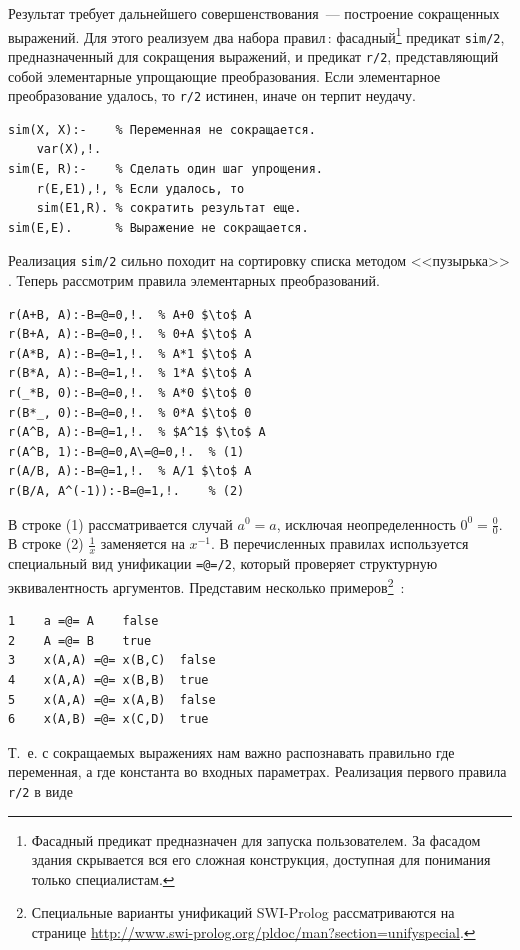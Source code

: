 \documentclass[a4paper,14pt, openany, twoside, draft]{extbook} %
\begin{document}
Результат требует дальнейшего совершенствования~--- построение сокращенных выражений.  Для этого реализуем два набора правил\,: фасадный\footnote{Фасадный предикат предназначен для запуска пользователем.  За фасадом здания скрывается вся его сложная конструкция, доступная для понимания только специалистам. } предикат \texttt{sim/2}, предназначенный для сокращения выражений, и предикат \texttt{r/2}, представляющий собой элементарные упрощающие преобразования.  Если элементарное преобразование удалось, то \texttt{r/2} истинен, иначе он терпит неудачу.

\begin{verbatim}
sim(X, X):-    % Переменная не сокращается.
    var(X),!.
sim(E, R):-    % Сделать один шаг упрощения.
    r(E,E1),!, % Если удалось, то
    sim(E1,R). % сократить результат еще.
sim(E,E).      % Выражение не сокращается.
\end{verbatim}

\noindent{}Реализация \texttt{sim/2} сильно походит на сортировку списка методом <<пузырька>> \cite{ais}.  Теперь рассмотрим правила элементарных преобразований.

\begin{verbatim}
r(A+B, A):-B=@=0,!.  % A+0 $\to$ A
r(B+A, A):-B=@=0,!.  % 0+A $\to$ A
r(A*B, A):-B=@=1,!.  % A*1 $\to$ A
r(B*A, A):-B=@=1,!.  % 1*A $\to$ A
r(_*B, 0):-B=@=0,!.  % A*0 $\to$ 0
r(B*_, 0):-B=@=0,!.  % 0*A $\to$ 0
r(A^B, A):-B=@=1,!.  % $A^1$ $\to$ A
r(A^B, 1):-B=@=0,A\=@=0,!.  % (1)
r(A/B, A):-B=@=1,!.  % A/1 $\to$ A
r(B/A, A^(-1)):-B=@=1,!.    % (2)
\end{verbatim}

В строке (1) рассматривается случай $a^0=a$, исключая неопределенность $0^0=\frac{0}{0}$.  В строке (2) $\frac{1}{x}$ заменяется на $x^{-1}$.  В перечисленных правилах используется специальный вид унификации \texttt{=@=/2}, который проверяет структурную эквивалентность аргументов.  Представим несколько примеров\footnote{Специальные варианты унификаций SWI-Prolog рассматриваются на странице \url{http://www.swi-prolog.org/pldoc/man?section=unifyspecial}.} \cite{SWIP}\,:

\begin{verbatim}
1    a =@= A    false
2    A =@= B    true
3    x(A,A) =@= x(B,C)  false
4    x(A,A) =@= x(B,B)  true
5    x(A,A) =@= x(A,B)  false
6    x(A,B) =@= x(C,D)  true
\end{verbatim}

Т.~е. с сокращаемых выражениях нам важно распознавать правильно где переменная, а где константа во входных параметрах.  Реализация первого правила \texttt{r/2} в виде
\end{document}
